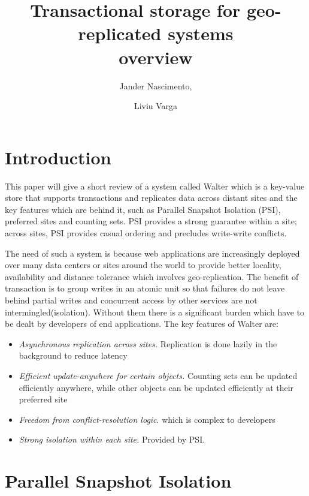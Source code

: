 \documentclass[a4paper]{article}
\begin{document}
\title{Transactional storage for geo-replicated systems \\ overview}

\author{Jander Nascimento,
\and Liviu Varga}

\maketitle



\section{Introduction}
This paper will give a short review of a system called Walter which is a key-value store that supports transactions and replicates data across distant sites and the key features which are behind it, such as Parallel Snapshot Isolation (PSI), preferred sites and counting sets. PSI provides a strong guarantee within a site; across sites, PSI provides casual ordering and precludes write-write conflicts.

The need of such a system is because web applications are increasingly deployed over many data centers or sites around the world to provide better locality, availability and distance tolerance which involves geo-replication. The benefit of transaction is to group writes in an atomic unit so that failures do not leave behind partial writes and concurrent access by other services are not intermingled(isolation). Without them there is a significant burden which have to be dealt by developers of end applications. The key features of Walter are:
\begin{itemize}
\item \textit{Asynchronous replication across sites.} Replication is done lazily in the background to reduce latency
\item \textit{Efficient update-anywhere for certain objects.} Counting sets can be updated efficiently anywhere, while other objects can be updated efficiently at their preferred site
\item \textit{Freedom from conflict-resolution logic}. which is complex to developers
\item \textit{Strong isolation within each site.} Provided by PSI.
\end{itemize}
          
\section{Parallel Snapshot Isolation}
\end{document}
